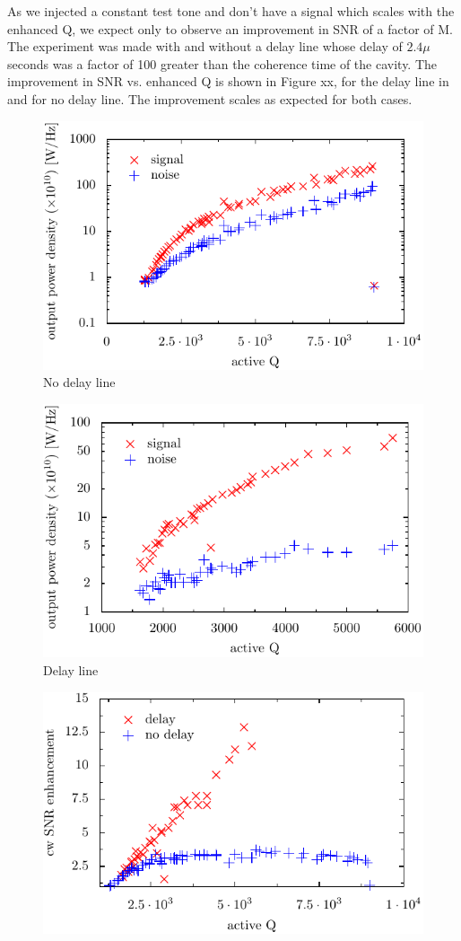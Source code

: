 \documentclass[aps,prl,twocolumn,groupedaddress]{revtex4-1}
\begin{document}
As we injected a constant test tone and don't have a signal which scales with the enhanced Q, we expect only to observe an improvement in SNR of a factor of M.
The experiment was made with and without a delay line whose delay of $2.4\mu$seconds was a factor of 100 greater than the coherence time of the cavity. The improvement in SNR vs. enhanced Q is shown in Figure xx, for the delay line in and for no delay line. The improvement scales as expected for both cases.

\begin{figure}[htbp]
\includegraphics[width=.5\textwidth]{figs/measurement_6}
\caption{No delay line}
\label{fig:measurement_6}
\end{figure}

\begin{figure}[htbp]
\includegraphics[width=.5\textwidth]{figs/measurement_7}
\caption{Delay line}
\label{fig:measurement_7}
\end{figure}

\begin{figure}[htbp]
\includegraphics[width=.5\textwidth]{figs/experiment}
\caption{}
\label{fig:summary_plots}
\end{figure}
\end{document}
